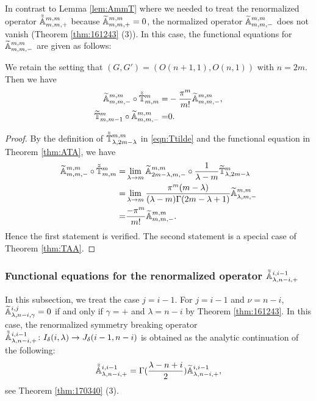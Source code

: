 In contrast to Lemma \ref{lem:AmmT}
 where we needed to treat the renormalized operator $\tilde{\tilde{{\mathbb{A}}}}_{{m},{m},{+}}^{{m, m}}$
 because ${\widetilde{\mathbb{A}}}_{{m},{m},{+}}^{{m, m}}=0$, 
 the normalized operator ${\widetilde{\mathbb{A}}}_{{m},{m},{-}}^{{m, m}}$ does not vanish
 (Theorem \ref{thm:161243} (3)).  
In this case,
 the functional equations for ${\widetilde{\mathbb{A}}}_{{m},{m},{-}}^{{m, m}}$ are given as follows:

\begin{lemma}
\label{lem:AmmT-}
We retain the setting that $(G,G')=(O(n+1,1),O(n,1))$
 with $n=2m$.  
Then we have 
\begin{align}
\label{eqn:ATAm-}
{\widetilde{\mathbb{A}}}_{{m},{m},{-}}^{{m,m}}\circ \tilde{\tilde{{\mathbb{T}}}}_{{m},{m}}^{{m}} = & - \frac {\pi^m}{m!}{\widetilde{\mathbb{A}}}_{{m},{m},{-}}^{{m,m}}, 
\\
\label{eqn:TATm-}
\widetilde{{\mathbb{T}}}_{{m},{m-1}}^{{m}}  \circ {\widetilde{\mathbb{A}}}_{{m},{m},{-}}^{{m,m}} = & 0.  
\end{align}
\end{lemma}

\begin{proof}
By the definition of $\tilde{\tilde{{\mathbb{T}}}}_{{\lambda},{2m-\lambda}}^{{m,m}}$
 in \eqref{eqn:Ttilde}
 and the functional equation in Theorem \ref{thm:ATA}, 
 we have
\begin{align*}
{\widetilde{\mathbb{A}}}_{{m},{m},{-}}^{{m,m}}\circ \tilde{\tilde{{\mathbb{T}}}}_{{m},{m}}^{{m}} 
= & \lim_{\lambda \to m} {\widetilde{\mathbb{A}}}_{{2m-\lambda},{m},{-}}^{{m,m}} 
    \circ \frac {1}{\lambda-m} \widetilde{{\mathbb{T}}}_{{\lambda},{2m-\lambda}}^{{m}}
\\
= & \lim_{\lambda \to m} \frac {\pi^m (m-\lambda)}{(\lambda-m)\Gamma(2m-\lambda+1)}
  {\widetilde{\mathbb{A}}}_{{\lambda},{m},{-}}^{{m,m}} 
\\ 
=&\frac {-\pi^m}{m!} {\widetilde{\mathbb{A}}}_{{m},{m},{-}}^{{m,m}}.  
\end{align*}
Hence the first statement is verified.  
The second statement is a special case
 of Theorem \ref{thm:TAA}.  
\end{proof}



\subsubsection{Functional equations for the renormalized operator
 $\tilde{\tilde{{\mathbb{A}}}}_{{\lambda},{n-i},{+}}^{{i,i-1}}$}
In this subsection, 
 we treat the case $j=i-1$.  
For $j=i-1$ and $\nu=n-i$, 
 ${\widetilde{\mathbb{A}}}_{{\lambda},{n-i},{\gamma}}^{{i,j}} =0$
 if and only if $\gamma=+$ and $\lambda =n-i$
 by Theorem \ref{thm:161243}.  
In this case, 
 the renormalized symmetry breaking operator
 $\tilde{\tilde{{\mathbb{A}}}}_{{\lambda},{n-i},{+}}^{{i,i-1}} \colon I_{\delta}(i,\lambda) \to J_{\delta}(i-1, n-i)$ is obtained 
 as the analytic continuation of the following:
\[
   \tilde{\tilde{{\mathbb{A}}}}_{{\lambda},{n-i},{+}}^{{i,i-1}}=\Gamma(\frac{\lambda-n+i}2){\widetilde{\mathbb{A}}}_{{\lambda},{n-i},{+}}^{{i,i-1}}, 
\]
see Theorem \ref{thm:170340} (3).  


